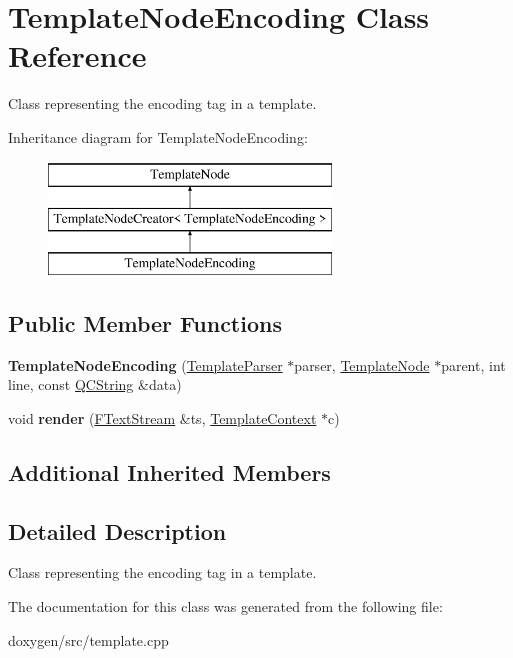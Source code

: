 \hypertarget{class_template_node_encoding}{}\section{Template\+Node\+Encoding Class Reference}
\label{class_template_node_encoding}


Class representing the \textquotesingle{}encoding\textquotesingle{} tag in a template.  


Inheritance diagram for Template\+Node\+Encoding\+:\begin{figure}[H]
\begin{center}
\leavevmode
\includegraphics[height=3.000000cm]{class_template_node_encoding}
\end{center}
\end{figure}
\subsection*{Public Member Functions}
\begin{DoxyCompactItemize}
\item 
\mbox{\label{class_template_node_encoding_aae276b6fbe23190b2e96ad0496bdc716}} 
{\bfseries Template\+Node\+Encoding} (\mbox{\hyperlink{class_template_parser}{Template\+Parser}} $\ast$parser, \mbox{\hyperlink{class_template_node}{Template\+Node}} $\ast$parent, int line, const \mbox{\hyperlink{class_q_c_string}{Q\+C\+String}} \&data)
\item 
\mbox{\label{class_template_node_encoding_aee7daf9816e50f45af66157fea00fbbd}} 
void {\bfseries render} (\mbox{\hyperlink{class_f_text_stream}{F\+Text\+Stream}} \&ts, \mbox{\hyperlink{class_template_context}{Template\+Context}} $\ast$c)
\end{DoxyCompactItemize}
\subsection*{Additional Inherited Members}


\subsection{Detailed Description}
Class representing the \textquotesingle{}encoding\textquotesingle{} tag in a template. 

The documentation for this class was generated from the following file\+:\begin{DoxyCompactItemize}
\item 
doxygen/src/template.\+cpp\end{DoxyCompactItemize}
